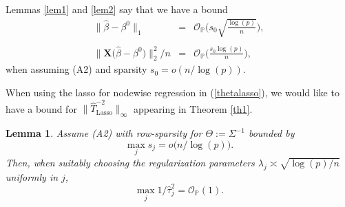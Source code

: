 \documentclass[aos,MSNbibl,dvips]{arximspdf}
\newtheorem{lemm}{Lemma}[section]
\newcommand{\PP}{\mathbb{P}}
\newcommand{\bx}{\mathbf{X}}
\begin{document}
Lemmas \ref{lem1} and \ref{lem2} say that we have a bound
%
\begin{eqnarray}
\label{ell1-bound} \bigl\|\hat{\beta} - \beta^0\bigr\|_1 &=& {\mathcal
O}_{\PP} \biggl(s_0 \sqrt {\frac
{\log(p)}{n}} \biggr),
\nonumber
\\[-8pt]
\\[-8pt]
\nonumber
\bigl\|
\bx\bigl(\hat{\beta} -\beta^0\bigr)\bigr\|_2^2/n& =&{
\mathcal O}_{\PP} \biggl( \frac{s_0 \log(p)}{n} \biggr),
\end{eqnarray}
%
when assuming (A2) and sparsity $s_0 =
o(n/\log(p))$.

When using the lasso for nodewise regression in (\ref{thetalasso}), we would
like to have a bound for $\|\hat{T}_{\mathrm{Lasso}}^{-2}\|_{\infty}$
appearing in Theorem \ref{th1}.
%
\begin{lemm}\label{lem3}
Assume \textup{(A2)} with row-sparsity for $\Theta:= \Sigma^{-1}$ bounded by
%
\[
\max_j s_j = o\bigl(n / \log(p)\bigr).
\]
%
Then, when suitably choosing the regularization parameters $\lambda_j
\asymp\sqrt{\log(p)/n}$
uniformly in $j$,
%
\[
\max_j 1/ \hat\tau_j^2 = {
\mathcal O}_{\PP}(1).
\]
%
\end{lemm}
\end{document}
